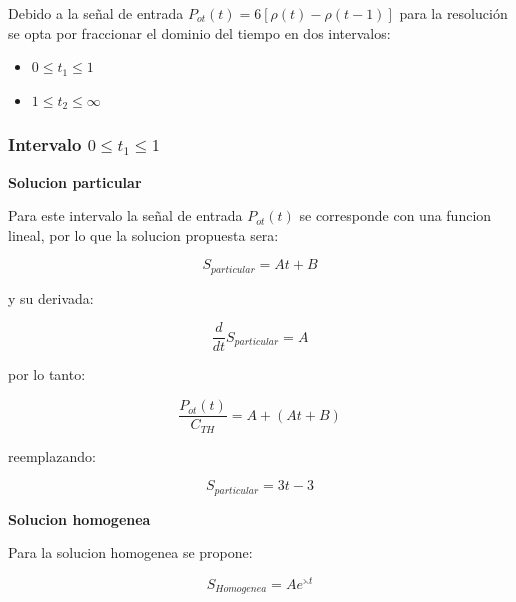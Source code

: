 \documentclass[a4paper,12pt]{article}
\begin{document}
\vspace*{0.2in}

Debido a la señal de entrada $P_{ot}(t)=6[\rho(t)-\rho(t-1)]$ para la resolución se opta por fraccionar el dominio del tiempo en dos intervalos:
\begin{itemize}
\item $0 \leq t_{1} \leq 1$
\item $1 \leq t_{2} \leq \infty$
\end{itemize}

\subsubsection{Intervalo $0 \leq t_{1} \leq 1$}
\vspace*{0.3in}
\textbf{Solucion particular}\par
\vspace*{0.3in}
Para este intervalo la señal de entrada $P_{ot}(t)$ se corresponde con una funcion lineal, por lo que la solucion propuesta sera:\par

\begin{equation}
S_{particular}=At+B
\end{equation}

y su derivada:

\begin{equation}
\frac{d}{dt}S_{particular}=A
\end{equation}

por lo tanto:\par

\begin{equation}
\frac{P_{ot}(t)}{C_{TH}}=A+(At+B)
\end{equation}

reemplazando:\par

\begin{equation}
S_{particular}=3t-3
\end{equation}

\vspace*{0.1in}

\textbf{Solucion homogenea}\par
\vspace*{0.2in}
Para la solucion homogenea se propone:\par

\begin{equation}
S_{Homogenea}=Ae^{\leftthreetimes t}
\end{equation}
\end{document}
